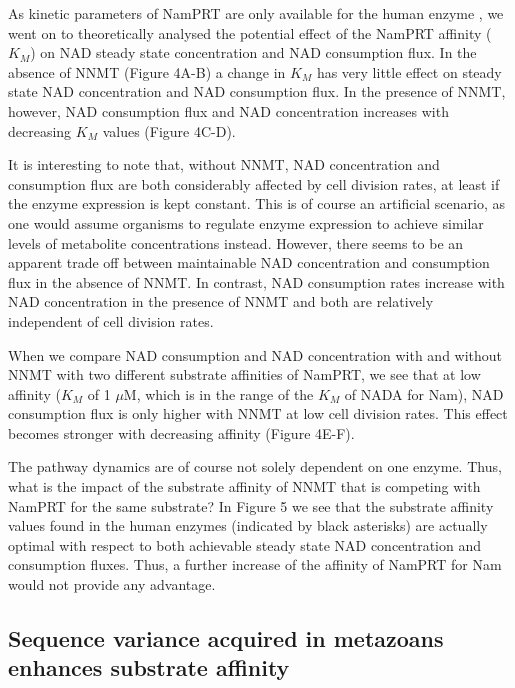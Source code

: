 As kinetic parameters of NamPRT are only available for the human enzyme \cite{Burgos2008}, we went on to theoretically analysed the potential effect of the NamPRT affinity ($K_{M}$) on NAD steady state concentration and NAD consumption flux. In the absence of NNMT (Figure 4A-B) a change in $K_{M}$ has very little effect on steady state NAD concentration and NAD consumption flux. In the presence of NNMT, however, NAD consumption flux and NAD concentration increases with decreasing $K_{M}$ values (Figure 4C-D).

It is interesting to note that, without NNMT, NAD concentration and consumption flux are both considerably affected by cell division rates, at least if the enzyme expression is kept constant. This is of course an artificial scenario, as one would assume organisms to regulate enzyme expression to achieve similar levels of metabolite concentrations instead. However, there seems to be an apparent trade off between maintainable NAD concentration and consumption flux in the absence of NNMT. In contrast, NAD consumption rates increase with NAD concentration in the presence of NNMT and both are relatively independent of cell division rates.

When we compare NAD consumption and NAD concentration with and without NNMT with two different substrate affinities of NamPRT, we see that at low affinity ($K_{M}$ of 1 $\mu$M, which is in the range of the $K_{M}$ of NADA for Nam), NAD consumption flux is only higher with NNMT at low cell division rates. This effect becomes stronger with decreasing affinity (Figure 4E-F).


The pathway dynamics are of course not solely dependent on one enzyme. Thus, what is the impact of the substrate affinity of NNMT that is competing with NamPRT for the same substrate? In Figure 5 we see that the substrate affinity values found in the human enzymes (indicated by black asterisks) are actually optimal with respect to both achievable steady state NAD concentration and consumption fluxes. Thus, a further increase of the affinity of NamPRT for Nam would not provide any advantage.


\subsection{Sequence variance acquired in metazoans enhances substrate affinity}

